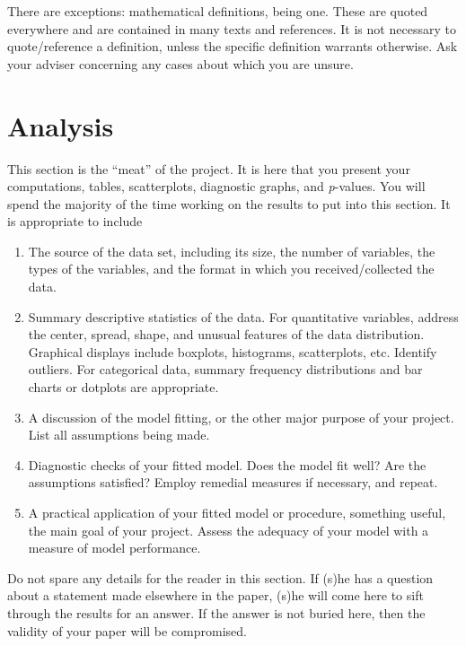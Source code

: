 \documentclass[11pt]{article}
\begin{document}
There are exceptions: mathematical definitions, being one. These are
quoted everywhere and are contained in many texts and references. It
is not necessary to quote/reference a definition, unless the specific
definition warrants otherwise. Ask your adviser concerning any cases
about which you are unsure.

\newpage

\section[Analysis]{Analysis}
\label{sec-4}

This section is the ``meat'' of the project. It is here that you present
your computations, tables, scatterplots, diagnostic graphs, and
\emph{p}-values. You will spend the majority of the time working on the
results to put into this section. It is appropriate to include

\begin{enumerate}
\item The source of the data set, including its size, the number of
variables, the types of the variables, and the format in which you
received/collected the data.
\item Summary descriptive statistics of the data. For quantitative
variables, address the center, spread, shape, and unusual features
of the data distribution. Graphical displays include boxplots,
histograms, scatterplots, etc. Identify outliers. For categorical
data, summary frequency distributions and bar charts or dotplots
are appropriate.
\item A discussion of the model fitting, or the other major purpose of
your project. List all assumptions being made.
\item Diagnostic checks of your fitted model. Does the model fit well?
Are the assumptions satisfied? Employ remedial measures if
necessary, and repeat.
\item A practical application of your fitted model or procedure,
something useful, the main goal of your project. Assess the
adequacy of your model with a measure of model performance.
\end{enumerate}

Do not spare any details for the reader in this section. If (s)he has
a question about a statement made elsewhere in the paper, (s)he will
come here to sift through the results for an answer.  If the answer is
not buried here, then the validity of your paper will be compromised.
\end{document}
